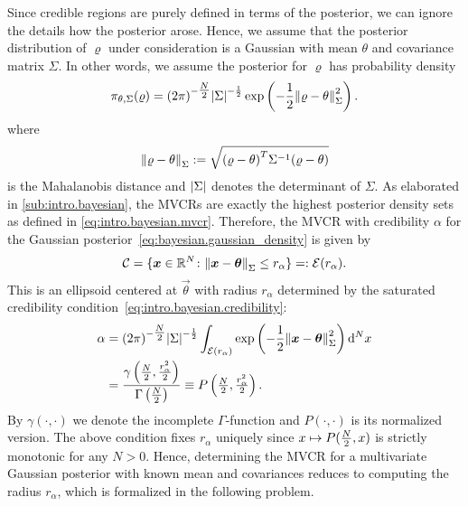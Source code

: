 Since credible regions are purely defined in terms of the posterior, we can ignore the details how the posterior arose.
Hence, we assume that the posterior distribution of $\varrho$ under consideration is a Gaussian with mean $\theta$ and covariance matrix $\Sigma$.
In other words, we assume the posterior for $\varrho$ has probability density
\begin{equation}
  \label{eq:bayesian.gaussian_density}
  \pi_{\theta,\Sigma}(\varrho) = {(2\pi)}^{-\tfrac{N}{2}} {\vert\Sigma\vert}^{-\frac{1}{2}} \exp\left( -\frac{1}{2} {\Vert\varrho - \theta\Vert}_\Sigma^2 \right).
\end{equation}
where
\begin{equation}
  {\Vert\varrho - \theta\Vert}_\Sigma := \sqrt{{(\varrho - \theta)}^T \Sigma^{-1} (\varrho - \theta)}
\end{equation}
is the Mahalanobis distance and  ${\vert\Sigma\vert}$ denotes the determinant of $\Sigma$.
As elaborated in \cref{sub:intro.bayesian}, the MVCRs are exactly the highest posterior density sets as defined in \cref{eq:intro.bayesian.mvcr}.
Therefore, the MVCR with credibility $\alpha$ for the Gaussian posterior~\eqref{eq:bayesian.gaussian_density} is given by
\begin{equation}
  \label{eq:bayesian.gaussian_cr}
  \mathcal{C} = \{ {\boldsymbol{x}} \in \mathbb{R}^N\colon {\Vert{\boldsymbol{x}} - {\boldsymbol{\theta}}\Vert}_\Sigma \le r_{\alpha} \} =: \mathcal{E}(r_{\alpha}).
\end{equation}
This is an ellipsoid centered at $\vec\theta$ with radius $r_{\alpha}$ determined by the saturated credibility condition~\eqref{eq:intro.bayesian.credibility}:
\begin{equation}
  \label{eq:bayesian.radius}
  \begin{split}
    \alpha
    &= {(2\pi)}^{-\tfrac{N}{2}} {\vert\Sigma\vert}^{-\frac{1}{2}} \int_{\mathcal{E}(r_{\alpha})} \exp\left( -\frac{1}{2} {\Vert{\boldsymbol{x}} - {\boldsymbol{\theta}}\Vert}_\Sigma^2 \right) \mathrm{d}^N x \\
    &= \frac{\gamma\left( \tfrac{N}{2}, \frac{r^2_{\alpha}}{2} \right)}{\Gamma\left( \tfrac{N}{2} \right)}
    \equiv P\left( \tfrac{N}{2}, \tfrac{r^2_{\alpha}}{2} \right).
    \end{split}
\end{equation}
By $\gamma(\cdot,\cdot)$ we denote the incomplete $\Gamma$-function and $P(\cdot,\cdot)$ is its normalized version.
The above condition fixes $r_{\alpha}$ uniquely since $x \mapsto P(\tfrac{N}{2}, x)$ is strictly monotonic for any $N > 0$.
Hence, determining the MVCR for a multivariate Gaussian posterior with known mean and covariances reduces to computing the radius $r_\alpha$, which is formalized in the following problem.
